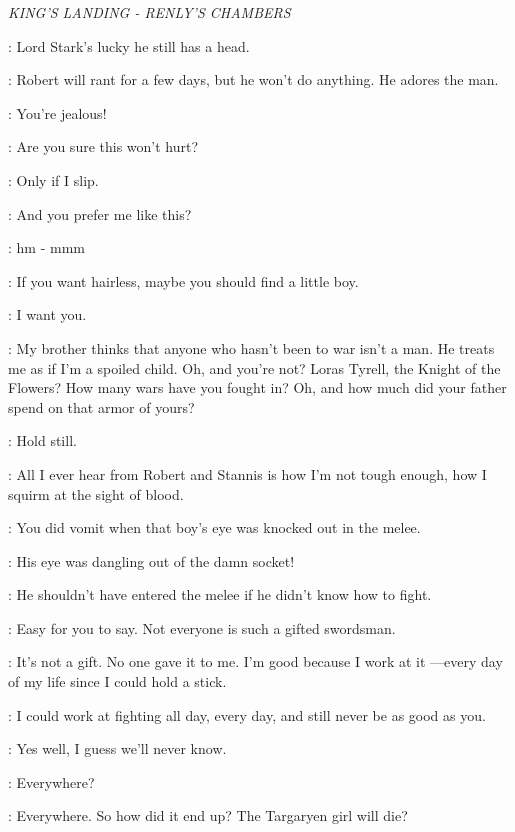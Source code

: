 \scene

\textit{KING'S LANDING - RENLY'S CHAMBERS} 


\LORAS: Lord Stark's lucky he still has a head. 

\RENLY: Robert will rant for a few days, but he won't do anything. He adores the man. 

\LORAS: You're jealous! 

\RENLY: Are you sure this won't hurt? 

\LORAS: Only if I slip. 

\RENLY: And you prefer me like this? 

\LORAS: hm - mmm

\RENLY: If you want hairless, maybe you should find a little boy. 

\LORAS: I want you. 

\RENLY: My brother thinks that anyone who hasn't been to war isn't a man. He treats me as if I'm a spoiled child.  Oh, and you're not? Loras Tyrell, the Knight of the Flowers? How many wars have you fought in? Oh, and how much did your father spend on that armor of yours? 

\LORAS: Hold still. 

\RENLY: All I ever hear from Robert and Stannis is how I'm not tough enough, how I squirm at the sight of blood. 

\LORAS: You did vomit when that boy's eye was knocked out in the melee. 

\RENLY: His eye was dangling out of the damn socket! 

\LORAS: He shouldn't have entered the melee if he didn't know how to fight. 

\RENLY: Easy for you to say. Not everyone is such a gifted swordsman. 

\LORAS: It's not a gift. No one gave it to me. I'm good because I work at it ---every day of my life since I could hold a stick. 

\RENLY: I could work at fighting all day, every day, and still never be as good as you. 

\LORAS: Yes well, I guess we'll never know. 


\RENLY: Everywhere? 

\LORAS: Everywhere. So how did it end up? The Targaryen girl will die? 

